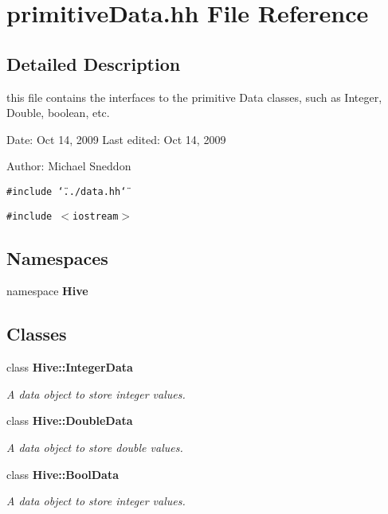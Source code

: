 \section{primitiveData.hh File Reference}
\label{primitiveData_8hh}


\subsection{Detailed Description}
this file contains the interfaces to the primitive Data classes, such as Integer, Double, boolean, etc.

\begin{Desc}
\item[Date:]Oct 14, 2009 Last edited: Oct 14, 2009\end{Desc}
\begin{Desc}
\item[Author:]Michael Sneddon \end{Desc}


{\tt \#include \char`\"{}../data.hh\char`\"{}}\par
{\tt \#include $<$iostream$>$}\par
\subsection*{Namespaces}
\begin{CompactItemize}
\item 
namespace {\bf Hive}
\end{CompactItemize}
\subsection*{Classes}
\begin{CompactItemize}
\item 
class {\bf Hive::IntegerData}
\begin{CompactList}\small\item\em A data object to store integer values. \item\end{CompactList}\item 
class {\bf Hive::DoubleData}
\begin{CompactList}\small\item\em A data object to store double values. \item\end{CompactList}\item 
class {\bf Hive::BoolData}
\begin{CompactList}\small\item\em A data object to store integer values. \item\end{CompactList}\end{CompactItemize}
